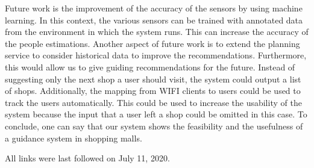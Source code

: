 \documentclass[runningheads]{llncs}
\begin{document}
Future work is the improvement of the accuracy of the sensors by using machine learning. In this context, the various sensors can be trained with annotated data from the environment in which the system runs. This can increase the accuracy of the people estimations. Another aspect of future work is to extend the planning service to consider historical data to improve the recommendations. Furthermore, 
this would allow us to give guiding recommendations for the future. Instead of suggesting only the next shop a user should visit, the system could output a list of shops. Additionally, the mapping from WIFI clients to users could be used to track the users automatically. This could be used to increase the usability of the system because the input that a user left a shop could be omitted in this case.
To conclude, one can say that our system shows the feasibility and the usefulness of a guidance system in shopping malls.
%
%



All links were last followed on July 11, 2020.
\end{document}
